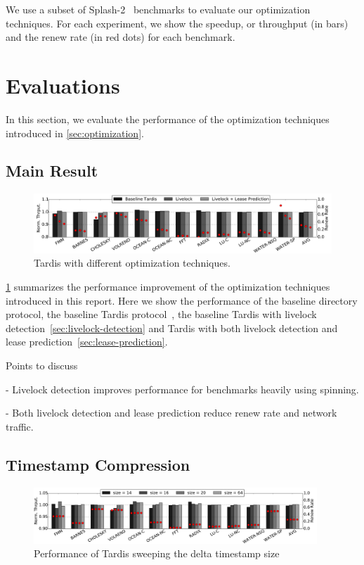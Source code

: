 \documentclass[12pt]{article}
\begin{document}
We use a subset of Splash-2~\cite{splash2} benchmarks to evaluate our 
optimization techniques. For each experiment, we show the speedup, or throughput (in 
bars) and the renew rate (in red dots) for each benchmark.

\section{Evaluations}

In this section, we evaluate the performance of the optimization 
techniques introduced in \cref{sec:optimization}.

\subsection{Main Result}

\begin{figure}
	\centering
	\includegraphics[width=0.95\columnwidth]{figs/main.pdf}
	\caption{ Tardis with different optimization techniques.}
	\label{fig:main}
\end{figure}

\cref{fig:main} summarizes the performance improvement of the 
optimization techniques introduced in this report. Here we show the 
performance of the baseline directory protocol, the baseline Tardis 
protocol~\cite{yu2015}, the baseline Tardis with livelock 
detection~\cref{sec:livelock-detection} and Tardis with both livelock 
detection and lease prediction~\cref{sec:lease-prediction}.

Points to discuss

- Livelock detection improves performance for benchmarks heavily using 
  spinning.

- Both livelock detection and lease prediction reduce renew rate and 
  network traffic.
  
  


\subsection{Timestamp Compression}

\begin{figure}
	\centering
	\includegraphics[width=0.95\textwidth]{figs/tssize.pdf}
	\caption{ Performance of Tardis sweeping the delta timestamp size}
	\label{fig:tssize}
\end{figure}
\end{document}
